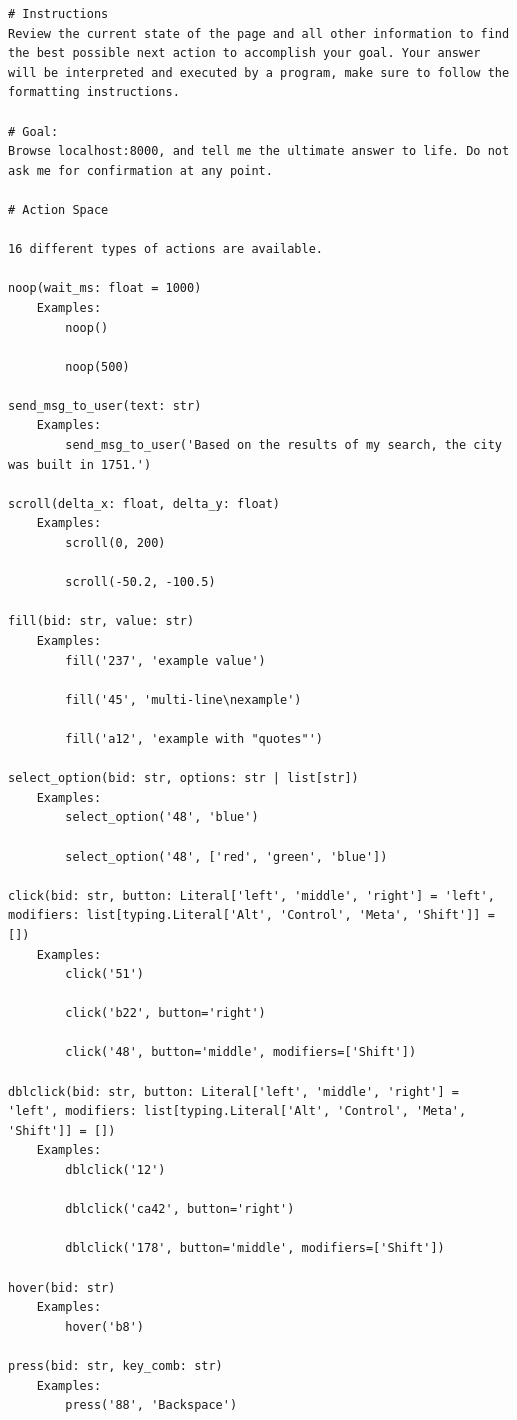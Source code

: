 \begin{verbatim}
# Instructions
Review the current state of the page and all other information to find the best possible next action to accomplish your goal. Your answer will be interpreted and executed by a program, make sure to follow the formatting instructions.

# Goal:
Browse localhost:8000, and tell me the ultimate answer to life. Do not ask me for confirmation at any point.

# Action Space

16 different types of actions are available.

noop(wait_ms: float = 1000)
    Examples:
        noop()

        noop(500)

send_msg_to_user(text: str)
    Examples:
        send_msg_to_user('Based on the results of my search, the city was built in 1751.')

scroll(delta_x: float, delta_y: float)
    Examples:
        scroll(0, 200)

        scroll(-50.2, -100.5)

fill(bid: str, value: str)
    Examples:
        fill('237', 'example value')

        fill('45', 'multi-line\nexample')

        fill('a12', 'example with "quotes"')

select_option(bid: str, options: str | list[str])
    Examples:
        select_option('48', 'blue')

        select_option('48', ['red', 'green', 'blue'])

click(bid: str, button: Literal['left', 'middle', 'right'] = 'left', modifiers: list[typing.Literal['Alt', 'Control', 'Meta', 'Shift']] = [])
    Examples:
        click('51')

        click('b22', button='right')

        click('48', button='middle', modifiers=['Shift'])

dblclick(bid: str, button: Literal['left', 'middle', 'right'] = 'left', modifiers: list[typing.Literal['Alt', 'Control', 'Meta', 'Shift']] = [])
    Examples:
        dblclick('12')

        dblclick('ca42', button='right')

        dblclick('178', button='middle', modifiers=['Shift'])

hover(bid: str)
    Examples:
        hover('b8')

press(bid: str, key_comb: str)
    Examples:
        press('88', 'Backspace')


\end{verbatim}

